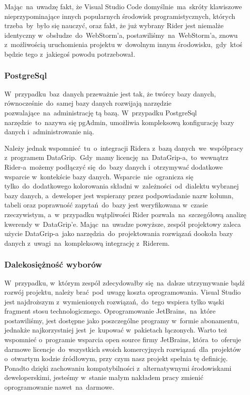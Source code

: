 Mając~na~uwadzę fakt, że Visual Studio Code domyślnie~ma~skróty klawiszowe nieprzypominające innych popularnych środowisk programistycznych, których trzeba~by~było się nauczyć, oraz fakt, że już wybrany Rider jest niemalże identyczny w~obsłudze~do~WebStorm'a, postawiliśmy~na~WebStorm'a, znowu z~możliwością uruchomienia projektu w~dowolnym innym środowisku,~gdy~ktoś będzie tego z~jakiegoś powodu potrzebował.

\subsubsection{\textnormal{PostgreSql}}
\indent W~przypadku~baz~danych przeważnie jest tak, że twórcy bazy danych, równocześnie~do~samej bazy danych rozwijają narzędzie pozwalające~na~administrację tą bazą.
W~przypadku PostgreSql narzędzie~to~nazywa się pgAdmin, umożliwia kompleksową konfigurację bazy danych i~administrowanie nią.

Należy jednak wspomnieć~tu~o~integracji Ridera z~bazą danych~we~współpracy z~programem DataGrip.~Gdy~mamy licencję~na~DataGrip-a,~to~wewnątrz Rider-a~możemy podłączyć się~do~bazy danych i~otrzymywać dodatkowe wsparcie w~kontekście bazy danych.
Wsparcie~nie~ogranicza się tylko~do~dodatkowego kolorowania składni w~zależności~od~dialektu wybranej bazy danych, a~deweloper jest wspierany przez podpowiadanie nazw kolumn, tabeli oraz poprawność zapytań~do~bazy jest  weryfikowana w~czasie rzeczywistym, a~w~przypadku wątpliwości Rider pozwala~na~szczegółową analizę kwerendy w~DataGrip'e.
Mając~na~uwadze powyższe, zespół projektowy zaleca użycie DataGrip-a~jako narzędzia~do~projektowania rozwiązań dookoła bazy danych z~uwagi~na~kompleksową integrację z~Riderem.

\subsubsection{\textnormal{Dalekosiężność wyborów}}
\indent W~przypadku, w~którym zespół zdecydowałby się~na~dalsze utrzymywanie bądź rozwój projektu, należy brać~pod~uwagę koszta oprogramowania.
Visual Studio jest najdroższym z~wymienionych rozwiązań,~do~tego wspiera tylko wąski fragment stosu technologicznego.
Oprogramowanie JetBrains,~na~które postawiliśmy, jest dostępne jako poszczególne programy w~formie abonamentu, jednakże najkorzystniej jest~je~kupować w~pakietach łączonych.
Warto też wspomnieć o~programie wsparcia open source firmy JetBrains, która~to~oferuje darmowe licencje~do~wszystkich swoich komercyjnych rozwiązań~dla~projektów o~otwartym kodzie źródłowym, przy czym nasz projekt spełnia tę definicję.
Ponadto dzięki zachowaniu kompatybilności z~alternatywnymi środowiskami deweloperskimi, jesteśmy w~stanie małym nakładem pracy zmienić oprogramowanie nawet~na~darmowe.

